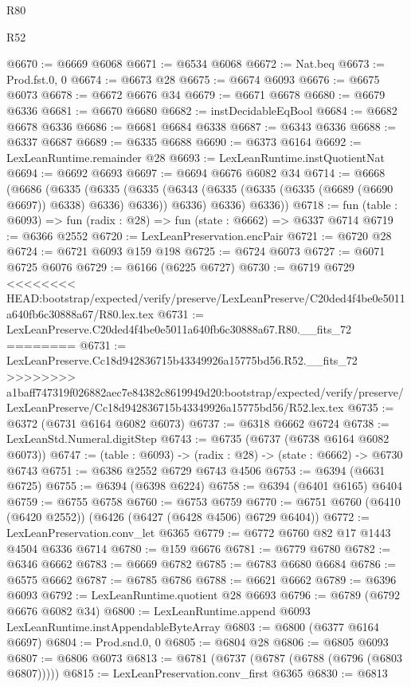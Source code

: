 \begin{lexlean}{R80}
\begin{lexlean}{R52}
\begin{coremodule}
{{{{{{{{{{{{{{{{{{{{{{{{{{{{{{{{{{{{{{{{{{{{{{{{{{{{{{{{{{{{{{{{{{{{{{{{{{{{{{{{{{{{{{{{{{{{{{{{{{{{{{{{{{{{{{{{{{{{{{{{{{{{{{{{{{{{{{{{{{{{{{{{{{{{{{{{{{{{{{{{{{{{{{{{{{{{{{{{{{{{{{{{{{{{{{{{{{{{{{@6670 := @6669 @6068
@6671 := @6534 @6068
@6672 := Nat.beq
@6673 := Prod.fst.{0, 0}
@6674 := @6673 @28
@6675 := @6674 @6093
@6676 := @6675 @6073
@6678 := @6672 @6676 @34
@6679 := @6671 @6678
@6680 := @6679 @6336
@6681 := @6670 @6680
@6682 := instDecidableEqBool
@6684 := @6682 @6678 @6336
@6686 := @6681 @6684 @6338
@6687 := @6343 @6336
@6688 := @6337 @6687
@6689 := @6335 @6688
@6690 := @6373 @6164
@6692 := LexLeanRuntime.remainder @28
@6693 := LexLeanRuntime.instQuotientNat
@6694 := @6692 @6693
@6697 := @6694 @6676 @6082 @34
@6714 := @6668
    (@6686
      (@6335
        (@6335
          (@6335 (@6343 (@6335 (@6335 (@6335 (@6689 (@6690 @6697)) @6338) @6336) @6336)) @6336)
          @6336)
        @6336))
@6718 := fun (table : @6093) => fun (radix : @28) => fun (state : @6662) => @6337 @6714
@6719 := @6366 @2552
@6720 := LexLeanPreservation.encPair
@6721 := @6720 @28
@6724 := @6721 @6093 @159 @198
@6725 := @6724 @6073
@6727 := @6071 @6725 @6076
@6729 := @6166 (@6225 @6727)
@6730 := @6719 @6729
<<<<<<<< HEAD:bootstrap/expected/verify/preserve/LexLeanPreserve/C20ded4f4be0e5011a640fb6c30888a67/R80.lex.tex
@6731 := LexLeanPreserve.C20ded4f4be0e5011a640fb6c30888a67.R80.__fits_72
========
@6731 := LexLeanPreserve.Cc18d942836715b43349926a15775bd56.R52.__fits_72
>>>>>>>> a1baff747319f026882aec7e84382c8619949d20:bootstrap/expected/verify/preserve/LexLeanPreserve/Cc18d942836715b43349926a15775bd56/R52.lex.tex
@6735 := @6372 (@6731 @6164 @6082 @6073)
@6737 := @6318 @6662 @6724
@6738 := LexLeanStd.Numeral.digitStep
@6743 := @6735 (@6737 (@6738 @6164 @6082 @6073))
@6747 := (table : @6093) -> (radix : @28) -> (state : @6662) -> @6730 @6743
@6751 := @6386 @2552 @6729 @6743 @4506
@6753 := @6394 (@6631 @6725)
@6755 := @6394 (@6398 @6224)
@6758 := @6394 (@6401 @6165) @6404
@6759 := @6755 @6758
@6760 := @6753 @6759
@6770 := @6751 @6760 (@6410 (@6420 @2552)) (@6426 (@6427 (@6428 @4506) @6729 @6404))
@6772 := LexLeanPreservation.conv_let @6365
@6779 := @6772 @6760 @82 @17 @1443 @4504 @6336 @6714
@6780 := @159 @6676
@6781 := @6779 @6780
@6782 := @6346 @6662
@6783 := @6669 @6782
@6785 := @6783 @6680 @6684
@6786 := @6575 @6662
@6787 := @6785 @6786
@6788 := @6621 @6662
@6789 := @6396 @6093
@6792 := LexLeanRuntime.quotient @28 @6693
@6796 := @6789 (@6792 @6676 @6082 @34)
@6800 := LexLeanRuntime.append @6093 LexLeanRuntime.instAppendableByteArray
@6803 := @6800 (@6377 @6164 @6697)
@6804 := Prod.snd.{0, 0}
@6805 := @6804 @28
@6806 := @6805 @6093
@6807 := @6806 @6073
@6813 := @6781 (@6737 (@6787 (@6788 (@6796 (@6803 @6807)))))
@6815 := LexLeanPreservation.conv_first @6365
@6830 := @6813
}}}}}}}}}}}}}}}}}}}}}}}}}}}}}}}}}}}}}}}}}}}}}}}}}}}}}}}}}}}}}}}}}}}}}}}}}}}}}}}}}}}}}}}}}}}}}}}}}}}}}}}}}}}}}}}}}}}}}}}}}}}}}}}}}}}}}}}}}}}}}}}}}}}}}}}}}}}}}}}}}}}}}}}}}}}}}}}}}}}}}}}}}}}}}}}}}}}}}}
\end{coremodule}
\end{lexlean}
\end{lexlean}
